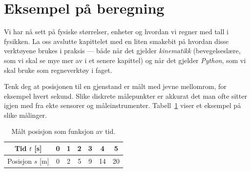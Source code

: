 

\section{Eksempel på beregning}
Vi har nå sett på fysiske størrelser, enheter og hvordan vi regner med tall i fysikken. La oss avslutte kapittelet med en liten smakebit på hvordan disse verktøyene brukes i praksis --- både når det gjelder \textit{kinematikk} (bevegelseslære, som vi skal se mye mer av i et senere kapittel) og når det gjelder \textit{Python}, som vi skal bruke som regneverktøy i faget.

Tenk deg at posisjonen til en gjenstand er målt med jevne mellomrom, for eksempel hvert sekund. Slike diskrete målepunkter er akkurat det man ofte sitter igjen med fra ekte sensorer og måleinstrumenter. Tabell~\ref{tab:posisjonsmaling} viser et eksempel på slike målinger.

\begin{table}[H]
\centering
\renewcommand{\arraystretch}{1.3}
\begin{tabular}{|c|c|c|c|c|c|c|}
\hline
\rowcolor{blue!20!black!10}
Tid $t$ [s] & 0 & 1 & 2 & 3 & 4 & 5 \\
\hline
Posisjon $s$ [m] & 0 & 2 & 5 & 9 & 14 & 20 \\
\hline
\end{tabular}
\caption{Målt posisjon som funksjon av tid.}
\label{tab:posisjonsmaling}
\end{table}

